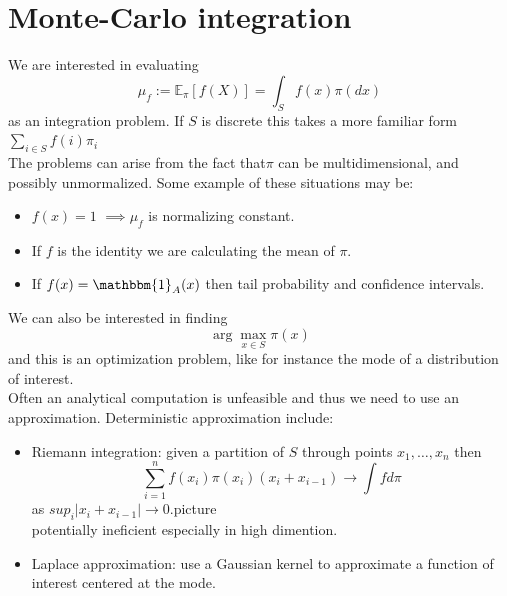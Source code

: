 \documentclass{article}
\begin{document}
\begin{figure}[H]
    \centering
    \label{dperiod}
\end{figure}
\section{Monte-Carlo integration}
We are interested in evaluating 
\begin{equation*}
    \mu_f := \mathbb{E}_{\pi}  [f(X)] = \int_S f(x) \pi(dx)
\end{equation*}
as an integration problem.
If $S$ is discrete this takes a more familiar form $\sum_{i \in S}f(i)\pi_i$ \\
The problems can arise from the fact that$\pi$ can be multidimensional, and possibly unmormalized. Some example of these situations may be:
\begin{itemize}
    \item $f(x) = 1$ $\implies \mu_f$ is normalizing constant.
    \item If $f$ is the identity we are calculating the mean of $\pi$.
    \item If $f(x) = \mathbbm{1}_A(x) $ then tail probability and confidence intervals. 
\end{itemize}
We can also be interested in finding 
\begin{equation*}
    \arg\max_{x \in S} \pi (x) 
\end{equation*}
and this is an optimization problem, like for instance the mode of a distribution of interest. \\
Often an analytical computation is unfeasible and thus we need to use an approximation. Deterministic approximation include:
\begin{itemize}
    \item Riemann integration: given a partition of $S$ through points  $x_1, \dots, x_n$ then 
    \begin{equation*}
        \sum_{i=1}^n f(x_i) \pi (x_i) (x_i+x_{i-1}) \rightarrow \int f d\pi
    \end{equation*}
    as $sup_i |x_i+x_{i-1}| \rightarrow 0$.picture \\
    potentially ineficient especially in high dimention.
    \item Laplace approximation: use a Gaussian kernel to approximate a function of interest centered at the mode.
    \end{itemize}
\end{document}
